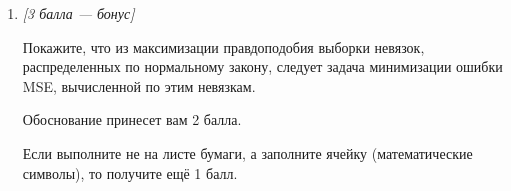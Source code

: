 \begin{enumerate}[label=\textbf{Task \arabic*:}, leftmargin=*]
\item \textit{[3 балла --- бонус]}

Покажите, что из максимизации правдоподобия выборки невязок, распределенных по нормальному закону, следует задача минимизации ошибки MSE, вычисленной по этим невязкам.

Обоснование принесет вам 2 балла.

Если выполните не на листе бумаги, а заполните ячейку (математические символы), то получите ещё 1 балл.

\end{enumerate}